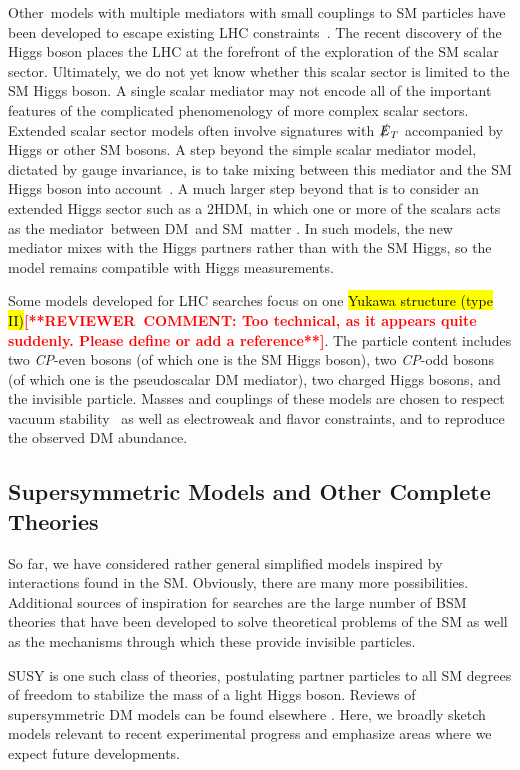 \documentclass{ar-1col}
\newcommand{\IP}{invisible particle}
\newcommand{\MET}{\ensuremath{\slashed{E}_T}\xspace}
\begin{document}
Other~{models with multiple mediators} with small couplings
to SM particles have been developed to escape existing LHC
constraints~\cite{Duerr:2016tmh}. The recent discovery of the
Higgs boson places the LHC at the forefront of the exploration of the
SM scalar sector. Ultimately, we do not yet know whether this scalar
sector is limited to the SM Higgs boson. A single scalar mediator
may not encode all of the important features of the complicated
phenomenology of more {complex scalar sectors}. Extended
scalar sector models often involve signatures with \MET accompanied by Higgs or other SM bosons. A step beyond the
simple scalar mediator model, dictated by gauge invariance, is to take mixing between this
mediator and the SM Higgs boson
into account~\cite{Bauer:2016gys,Berlin:2014cfa}. A much larger
step beyond that is to consider an extended Higgs sector such as a
2HDM, in which one or more of the scalars
acts as the mediator~between DM\ and SM\ matter \cite{Bauer:2017ota,Goncalves:2016iyg,Bell:2016ekl}. In
such models, the new mediator mixes with the Higgs partners
rather than with the SM Higgs, so the model remains
compatible with Higgs measurements. 

Some models developed for LHC
searches focus on one \hl{Yukawa structure (type II)}\textbf{\textcolor{red}{[**REVIEWER\ COMMENT: Too technical, as it appears quite suddenly. Please define or add a reference**]}}. The particle
content includes two \textit{CP}-even bosons (of which one is the SM Higgs
boson), two \textit{CP}-odd bosons (of which one is the pseudoscalar DM
mediator), two charged Higgs bosons, and the \IP. Masses and
couplings of these models are chosen to respect vacuum
stability~\cite{Goncalves:2016iyg} as well as electroweak and flavor
constraints, and to reproduce the observed DM abundance.

\subsection{Supersymmetric Models and Other Complete Theories}\label{sec:SUSYModels}

So far, we have considered rather general simplified models
inspired by interactions found in the SM. Obviously, there are many more possibilities. Additional sources of inspiration for
searches are the large number of BSM theories that have been
developed to solve theoretical problems of the SM as well as the
mechanisms through which these provide {\IP}s.

SUSY is one such class of theories, postulating
partner particles to all SM degrees of freedom to stabilize the
mass of a light Higgs boson. Reviews of supersymmetric DM models
can be found elsewhere \cite{Feng:2010gw}. Here, we broadly
sketch models relevant to recent experimental progress and emphasize areas
where we expect future developments.
\end{document}
